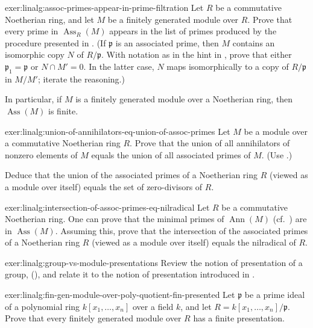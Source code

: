 \begin{exer}{}{exer:linalg:assoc-primes-appear-in-prime-filtration}
  Let $R$ be a commutative Noetherian ring, and let $M$ be a finitely
  generated module over $R$. Prove that every prime in
  $\operatorname{Ass}_R(M)$ appears in the list of primes produced by
  the procedure presented in
  . (If
  $\mathfrak{p}$ is an associated prime, then $M$ contains an
  isomorphic copy $N$ of $R/\mathfrak{p}$. With notation as in the
  hint in , prove
  that either $\mathfrak{p}_1 = \mathfrak{p}$ or $N \cap M' = 0$. In
  the latter case, $N$ maps isomorphically to a copy of
  $R/\mathfrak{p}$ in $M/M'$; iterate the reasoning.)

  In particular, if $M$ is a finitely generated module over a
  Noetherian ring, then $\operatorname{Ass}(M)$ is finite.
\end{exer}
\begin{exer}{}{exer:linalg:union-of-annihilators-eq-union-of-assoc-primes}
  Let $M$ be a module over a commutative Noetherian ring $R$. Prove
  that the union of all annihilators of nonzero elements of $M$ equals
  the union of all associated primes of $M$. (Use
  .)

  Deduce that the union of the associated primes of a Noetherian ring
  $R$ (viewed as a module over itself) equals the set of zero-divisors
  of $R$.
\end{exer}
\begin{exer}{}{exer:linalg:intersection-of-assoc-primes-eq-nilradical}
  Let $R$ be a commutative Noetherian ring. One can prove that the
  minimal primes of $\operatorname{Ann}(M)$ (cf.\
  ) are in
  $\operatorname{Ass}(M)$. Assuming this, prove that the intersection
  of the associated primes of a Noetherian ring $R$ (viewed as a
  module over itself) equals the nilradical of $R$.
\end{exer}
\begin{exer}{}{exer:linalg:group-vs-module-presentations}
  Review the notion of presentation of a group,
  (), and relate it to the notion
  of presentation introduced in
  .
\end{exer}
\begin{exer}{}{exer:linalg:fin-gen-module-over-poly-quotient-fin-presented}
  Let $\mathfrak{p}$ be a prime ideal of a polynomial ring 
  $k[x_1, \dots, x_n]$ over a field $k$, and let
  $R = k[x_1, \dots, x_n]/\mathfrak{p}$. Prove that every finitely
  generated module over $R$ has a finite presentation.
\end{exer}
